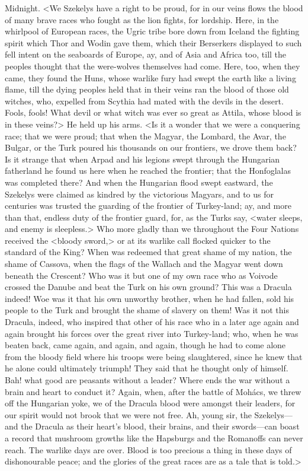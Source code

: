 \begin{diary}{Midnight.}
<We Szekelys have a right to be proud, for in our veins flows the blood of many brave races who fought as the lion fights, for lordship. Here, in the whirlpool of European races, the Ugric tribe bore down from Iceland the fighting spirit which Thor and Wodin gave them, which their Berserkers displayed to such fell intent on the seaboards of Europe, ay, and of Asia and Africa too, till the peoples thought that the were-wolves themselves had come. Here, too, when they came, they found the Huns, whose warlike fury had swept the earth like a living flame, till the dying peoples held that in their veins ran the blood of those old witches, who, expelled from Scythia had mated with the devils in the desert. Fools, fools! What devil or what witch was ever so great as Attila, whose blood is in these veins?> He held up his arms. <Is it a wonder that we were a conquering race; that we were proud; that when the Magyar, the Lombard, the Avar, the Bulgar, or the Turk poured his thousands on our frontiers, we drove them back? Is it strange that when Arpad and his legions swept through the Hungarian fatherland he found us here when he reached the frontier; that the Honfoglalas was completed there? And when the Hungarian flood swept eastward, the Szekelys were claimed as kindred by the victorious Magyars, and to us for centuries was trusted the guarding of the frontier of Turkey-land; ay, and more than that, endless duty of the frontier guard, for, as the Turks say, <water sleeps, and enemy is sleepless.> Who more gladly than we throughout the Four Nations received the <bloody sword,> or at its warlike call flocked quicker to the standard of the King? When was redeemed that great shame of my nation, the shame of Cassova, when the flags of the Wallach and the Magyar went down beneath the Crescent? Who was it but one of my own race who as Voivode crossed the Danube and beat the Turk on his own ground? This was a Dracula indeed! Woe was it that his own unworthy brother, when he had fallen, sold his people to the Turk and brought the shame of slavery on them! Was it not this Dracula, indeed, who inspired that other of his race who in a later age again and again brought his forces over the great river into Turkey-land; who, when he was beaten back, came again, and again, and again, though he had to come alone from the bloody field where his troops were being slaughtered, since he knew that he alone could ultimately triumph! They said that he thought only of himself. Bah! what good are peasants without a leader? Where ends the war without a brain and heart to conduct it? Again, when, after the battle of Mohács, we threw off the Hungarian yoke, we of the Dracula blood were amongst their leaders, for our spirit would not brook that we were not free. Ah, young sir, the Szekelys—and the Dracula as their heart's blood, their brains, and their swords—can boast a record that mushroom growths like the Hapsburgs and the Romanoffs can never reach. The warlike days are over. Blood is too precious a thing in these days of dishonourable peace; and the glories of the great races are as a tale that is told.>


\end{diary}
